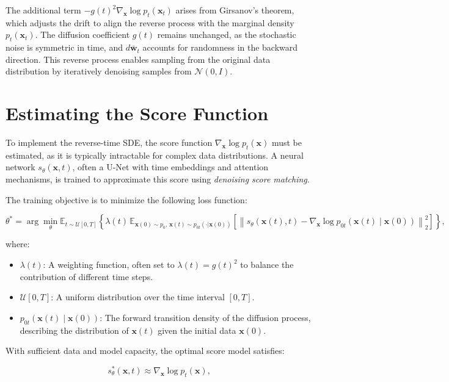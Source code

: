 \documentclass[12pt]{article}
\begin{document}
The additional term $-g(t)^2 \nabla_{\mathbf{x}} \log p_t(\mathbf{x}_t)$ arises from Girsanov’s theorem, which adjusts the drift to align the reverse process with the marginal density $p_t(\mathbf{x}_t)$. The diffusion coefficient $g(t)$ remains unchanged, as the stochastic noise is symmetric in time, and $d\bar{\mathbf{w}}_t$ accounts for randomness in the backward direction. This reverse process enables sampling from the original data distribution by iteratively denoising samples from $\mathcal{N}(0, I)$.

\section{Estimating the Score Function}

To implement the reverse-time SDE, the score function $\nabla_{\mathbf{x}} \log p_t(\mathbf{x})$ must be estimated, as it is typically intractable for complex data distributions. A neural network $s_\theta(\mathbf{x}, t)$, often a U-Net with time embeddings and attention mechanisms, is trained to approximate this score using \textit{denoising score matching}.

The training objective is to minimize the following loss function:

\begin{equation}
    \theta^* = \arg\min_{\theta} \mathbb{E}_{t \sim \mathcal{U}[0,T]} \left\{ \lambda(t) \, \mathbb{E}_{\mathbf{x}(0) \sim p_0, \, \mathbf{x}(t) \sim p_{0t}(\cdot|\mathbf{x}(0))} \left[ \left\| s_\theta(\mathbf{x}(t), t) - \nabla_{\mathbf{x}} \log p_{0t}(\mathbf{x}(t) \mid \mathbf{x}(0)) \right\|_2^2 \right] \right\},
\end{equation}

where:
\begin{itemize}
    \item $\lambda(t)$: A weighting function, often set to $\lambda(t) = g(t)^2$ to balance the contribution of different time steps.
    \item $\mathcal{U}[0,T]$: A uniform distribution over the time interval $[0, T]$.
    \item $p_{0t}(\mathbf{x}(t) \mid \mathbf{x}(0))$: The forward transition density of the diffusion process, describing the distribution of $\mathbf{x}(t)$ given the initial data $\mathbf{x}(0)$.
\end{itemize}

With sufficient data and model capacity, the optimal score model satisfies:

\begin{equation}
    s_\theta^*(\mathbf{x}, t) \approx \nabla_{\mathbf{x}} \log p_t(\mathbf{x}),
\end{equation}
\end{document}

